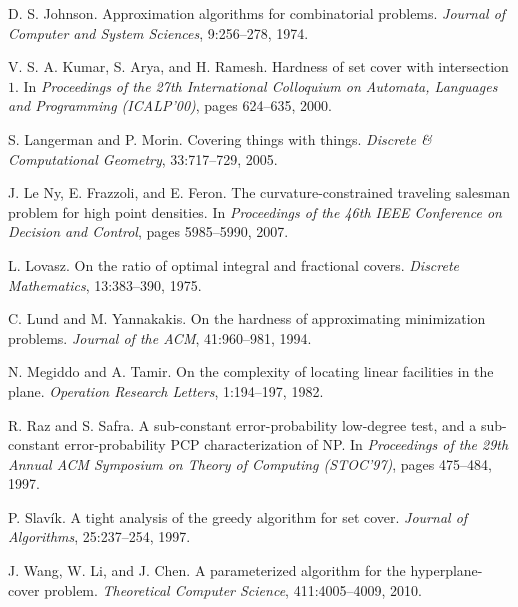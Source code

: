 \documentclass[letterpaper,11pt]{article}
\begin{document}
\begin{thebibliography}{99}
D. S. Johnson.
Approximation algorithms for combinatorial problems.
\emph{Journal of Computer and System Sciences},
9:256--278, 1974.

V. S. A. Kumar, S. Arya, and H. Ramesh.
Hardness of set cover with intersection $1$.
In \emph{Proceedings of the 27th International Colloquium on Automata,
  Languages and Programming (ICALP'00)}, 
pages 624--635, 2000.

S. Langerman and P. Morin.
Covering things with things.
\emph{Discrete \& Computational Geometry},
33:717--729, 2005.

J. Le Ny, E. Frazzoli, and E. Feron.
The curvature-constrained traveling salesman problem for high point densities.
In \emph{Proceedings of the 46th IEEE Conference on Decision and Control},
pages 5985--5990, 2007.

L. Lovasz.
On the ratio of optimal integral and fractional covers.
\emph{Discrete Mathematics},
13:383--390, 1975.

C. Lund and M. Yannakakis.
On the hardness of approximating minimization problems.
\emph{Journal of the ACM},
41:960--981, 1994.

N. Megiddo and A. Tamir.
On the complexity of locating linear facilities in the plane.
\emph{Operation Research Letters},
1:194--197, 1982.

R. Raz and S. Safra.
A sub-constant error-probability low-degree test, and a sub-constant
error-probability PCP characterization of NP. In
\emph{Proceedings of the 29th Annual ACM Symposium on Theory of Computing (STOC'97)},
pages 475--484, 1997.

P. Slav\'ik.
A tight analysis of the greedy algorithm for set cover.
\emph{Journal of Algorithms},
25:237--254, 1997.

J. Wang, W. Li, and J. Chen.
A parameterized algorithm for the hyperplane-cover problem.
\emph{Theoretical Computer Science},
411:4005--4009, 2010.

\end{thebibliography}
\end{document}

